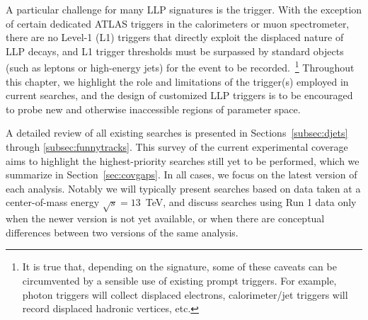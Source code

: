 A particular challenge for many LLP signatures is the trigger. With the exception of certain dedicated ATLAS triggers in the calorimeters or muon spectrometer, there are no Level-1 (L1) triggers that directly exploit the displaced nature of LLP decays, and L1 trigger thresholds must be surpassed by standard objects (such as leptons or high-energy jets) for the event to be recorded.~\footnote{It is true that, depending on the signature, some of these caveats can be circumvented by a sensible use of existing prompt triggers.  For example, photon triggers will collect displaced electrons, calorimeter/jet triggers will record displaced hadronic vertices, etc.} Throughout this chapter, we highlight the role and limitations of the trigger(s) employed in current searches, and the design of customized LLP triggers is to be encouraged to probe new and otherwise inaccessible regions of parameter space.

A detailed review of all existing searches is presented in Sections~\ref{subsec:djets} through \ref{subsec:funnytracks}. This survey of the current experimental coverage aims to highlight the highest-priority searches still yet to be performed, which we summarize in Section~\ref{sec:covgaps}. In all cases, we focus on the latest version of each analysis. Notably we will typically present searches based on data taken at a center-of-mass energy $\sqrt{s}=13$~TeV, and discuss searches using Run 1 data only when the newer version is not yet available, or when there are conceptual differences between two versions of the same analysis.

